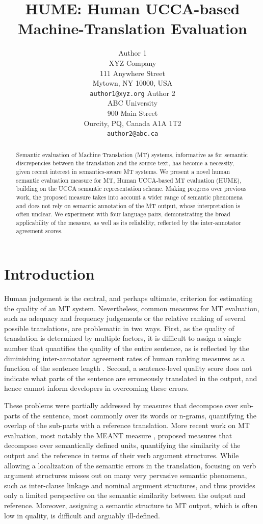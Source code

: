 \documentclass[11pt]{article}
\title{HUME: Human UCCA-based Machine-Translation Evaluation}
\author{Author 1\\
	    XYZ Company\\
	    111 Anywhere Street\\
	    Mytown, NY 10000, USA\\
	    {\tt author1@xyz.org}
	  \And
	Author 2\\
  	ABC University\\
  	900 Main Street\\
  	Ourcity, PQ, Canada A1A 1T2\\
  {\tt author2@abc.ca}}
\date{}
\begin{document}
\maketitle

\begin{abstract}

  Semantic evaluation of Machine Translation (MT) systems, informative as for
  semantic discrepencies between the translation and the source text,
  has become a necessity, given recent interest in semantics-aware MT systems.
  We present a novel human semantic evaluation measure for MT, Human
  UCCA-based MT evaluation (HUME), building on the UCCA semantic representation scheme.
  Making progress over previous work, the proposed measure takes into account
  a wider range of semantic phenomena and does not rely on semantic annotation
  of the MT output, whose interpretation is often unclear. 
  We experiment with four language pairs, demonstrating the broad applicability of
  the measure, as well as its reliability, reflected by the inter-annotator agreement
  scores.

\end{abstract}


\section{Introduction}\label{sec:intro}

Human judgement is the central, and perhaps ultimate, criterion for estimating the
quality of an MT system.
Nevertheless, common measures for MT evaluation, such as adequacy and frequency judgements
or the relative ranking of several possible translations, are problematic in two ways.
First, as the quality of translation is determined by multiple factors, it is difficult
to assign a single number that quantifies the quality of the entire sentence, as is reflected
by the diminishing inter-annotator agreement rates of human ranking measures
as a function of the sentence length \cite{Bojar:2011}.
Second, a sentence-level quality score does not indicate what parts of the sentence
are erroneously translated in the output, and hence cannot inform developers in overcoming these errors.

These problems were partially addressed by measures that decompose over sub-parts of the sentence,
most commonly over its words or n-grams, quantifying the overlap of the sub-parts with a reference
translation. More recent work on MT evaluation, most notably the MEANT measure \cite{lo2011structured},
proposed measures that decompose over semantically defined units,
quantifying the similarity of the output and the reference in terms of their verb argument structures.
While allowing a localization of the semantic errors in the translation,
focusing on verb argument structures misses out on many very pervasive semantic phenomena,
such as inter-clause linkage and nominal argument structures, and thus provides only a limited
perspective on the semantic similarity between the output and reference.
Moreover, assigning a semantic structure to MT output, which is often low in quality,
is difficult and arguably ill-defined.
\end{document}
